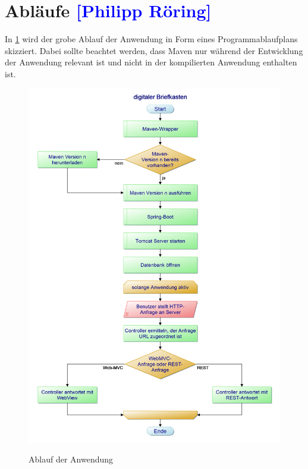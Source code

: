 

\section{Abläufe \textcolor{blue}{[Philipp Röring]}}

In \cref{fig:digitaler-briefkasten-pap} wird der grobe Ablauf der Anwendung in Form eines Programmablaufplans skizziert.
Dabei sollte beachtet werden, dass Maven nur während der Entwicklung der Anwendung relevant ist und nicht in der kompilierten
Anwendung enthalten ist.

\begin{figure}[hbt]
    \centering
    \begin{minipage}[t]{0.7\textwidth}
        \caption{Ablauf der Anwendung}
        \includegraphics[width=1\textwidth]{img/digitaler-Briefkasten-pap.png}\\
        \label{fig:digitaler-briefkasten-pap}
    \end{minipage}
\end{figure}








